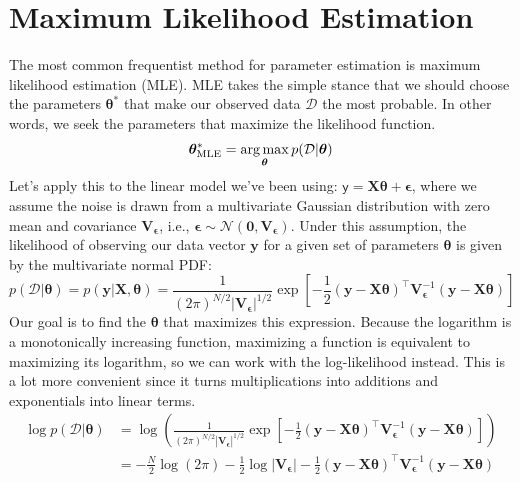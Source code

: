 \section{Maximum Likelihood Estimation}
The most common frequentist method for parameter estimation is maximum likelihood estimation (MLE). MLE takes the simple stance that we should choose the parameters $\boldsymbol{\theta}^*$ that make our observed data $\mathcal{D}$ the most probable. In other words, we seek the parameters that maximize the likelihood function.
\begin{equation}
    \boldsymbol{\theta}_{\text{MLE}}^* = \operatorname*{arg\,max}_{\boldsymbol{\theta}} p(\mathcal{D}|\boldsymbol{\theta})
\end{equation}
Let's apply this to the linear model we've been using: $\boldsymbol{\mathsf{y}} = \mathbf{X}\boldsymbol{\theta} + \boldsymbol{\epsilon}$, where we assume the noise is drawn from a multivariate Gaussian distribution with zero mean and covariance $\mathbf{V}_{\boldsymbol{\epsilon}}$, i.e., $\boldsymbol{\epsilon} \sim \mathcal{N}(\mathbf{0}, \mathbf{V}_{\boldsymbol{\epsilon}})$. Under this assumption, the likelihood of observing our data vector $\mathbf{y}$ for a given set of parameters $\boldsymbol{\theta}$ is given by the multivariate normal PDF:
\begin{equation}
    p(\mathcal{D}|\boldsymbol{\theta}) = p(\mathbf{y}|\mathbf{X}, \boldsymbol{\theta}) = \frac{1}{(2\pi)^{N/2}|\mathbf{V}_{\boldsymbol{\epsilon}}|^{1/2}} \exp\left[-\frac{1}{2}(\mathbf{y} - \mathbf{X}\boldsymbol{\theta})^\top \mathbf{V}_{\boldsymbol{\epsilon}}^{-1}(\mathbf{y} - \mathbf{X}\boldsymbol{\theta})\right]
\end{equation}
Our goal is to find the $\boldsymbol{\theta}$ that maximizes this expression. Because the logarithm is a monotonically increasing function, maximizing a function is equivalent to maximizing its logarithm, so we can work with the log-likelihood instead. This is a lot more convenient since it turns multiplications into additions and exponentials into linear terms.
\begin{align*}
    \log p(\mathcal{D}|\boldsymbol{\theta}) &= \log \left( \frac{1}{(2\pi)^{N/2}|\mathbf{V}_{\boldsymbol{\epsilon}}|^{1/2}} \exp\left[-\frac{1}{2}(\mathbf{y} - \mathbf{X}\boldsymbol{\theta})^\top \mathbf{V}_{\boldsymbol{\epsilon}}^{-1}(\mathbf{y} - \mathbf{X}\boldsymbol{\theta})\right] \right) \\
    &= -\frac{N}{2}\log(2\pi) - \frac{1}{2}\log|\mathbf{V}_{\boldsymbol{\epsilon}}| - \frac{1}{2}(\mathbf{y} - \mathbf{X}\boldsymbol{\theta})^\top \mathbf{V}_{\boldsymbol{\epsilon}}^{-1}(\mathbf{y} - \mathbf{X}\boldsymbol{\theta})
\end{align*}
